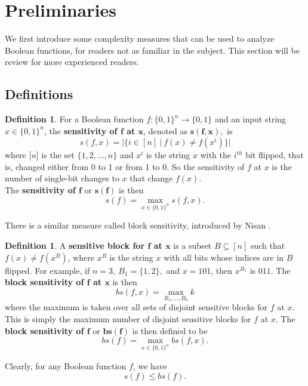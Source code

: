 \documentclass[psamsfonts]{amsart}
\theoremstyle{definition}
\newtheorem{defn}[theorem]{Definition}
\theoremstyle{remark}
\numberwithin{equation}{section}
\begin{document}
	\section{Preliminaries}
		We first introduce some complexity measures that can be used to analyze Boolean functions, for readers not as familiar in the subject.  This section will be review for more 
		experienced readers.   

	\subsection{Definitions}
\begin{defn}\label{sensitivity}
For a Boolean function $f: \{0,1\}^n \to \{0,1\}$ and an input string $x \in \{0,1\}^{n}$, the \textbf{sensitivity of $\boldsymbol{f}$ at $\boldsymbol{x}$}, denoted as $\boldsymbol{s(f,x)},$ is $$s(f,x) =|\{i \in [n] \: | \: f(x) \neq f(x^{i})\}|$$ where 
$\lbrack n \rbrack$ is the set 
$\{1,2,\ldots ,n\}$ and 
$x^{i}$ is the string $x$ with the $i^{th}$ bit flipped, 
that is, changed either from 0 to 1 or from 1 to 0.  So the sensitivity of $f$ at $x$ is the number of single-bit changes to $x$ that change $f(x)$.  
\\
The \textbf{sensitivity of $\boldsymbol{f}$} or $\boldsymbol{s(f)}$ is then $$s(f) = \max\limits_{x \in \{0,1\}^{n}} s(f,x).$$
\end{defn}

There is a similar measure called block sensitivity, introduced by Nisan \cite{N}.  
\begin{defn}\label{blocksensitivity}
A \textbf{sensitive block for $\boldsymbol{f}$ at $\boldsymbol{x}$} is a subset $B \subseteq [n]$ such that 
$f(x) \neq f(x^{B})$, where $x^{B}$ is the string $x$ with all bits whose indices are in $B$ flipped.
For example, if $n=3, \: B_{1} = \{1,2\},$ and $x=101$, then $x^{B_{1}}$ is $011$.  
The \textbf{block sensitivity of $\boldsymbol{f}$ at $\boldsymbol{x}$} is then
$$bs(f,x) = \max_{B_{1}, \ldots , B_{k}} k$$ 
where the maximum is taken over all sets of disjoint sensitive blocks for $f$ at $x$.  This is simply the maximum number of disjoint sensitive blocks for $f$ at $x$.
The \textbf{block sensitivity of $\boldsymbol{f}$} or $\boldsymbol{bs(f)}$ is then defined to be
$$bs(f) = \max\limits_{x \in \{0,1\}^{n}} bs(f,x).$$
\end{defn}

Clearly, for any Boolean function $f$, we have 
		\begin{equation}
			s(f) \leq bs(f). \nonumber
		\end{equation}
		
\end{document}
